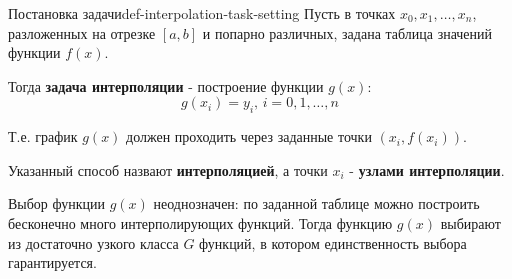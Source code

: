 \documentclass[14pt]{extarticle}
\begin{document}
    \begin{definition}{Постановка задачи}{def-interpolation-task-setting}
        Пусть в точках $x_{0}, x_{1}, \ldots, x_{n}$, разложенных на отрезке $[a, b]$ и попарно различных, задана таблица значений функции $f(x)$.

        \vspace{\baselineskip}

        Тогда \textbf{задача интерполяции} - построение функции $g(x)$:
        $$g(x_{i}) = y_{i} \text{, } i = 0, 1, \ldots, n$$
    
        Т.е. график $g(x)$ должен проходить через заданные точки $(x_{i}, f(x_{i}))$.

        \vspace{\baselineskip}

        Указанный способ назвают \textbf{интерполяцией}, а точки $x_{i}$ - \textbf{узлами интерполяции}.
    \end{definition}

    Выбор функции $g(x)$ неоднозначен: по заданной таблице можно построить бесконечно много интерполирующих функций. Тогда функцию $g(x)$ выбирают из достаточно узкого класса $G$ функций, в котором единственность выбора гарантируется. 
\end{document}
